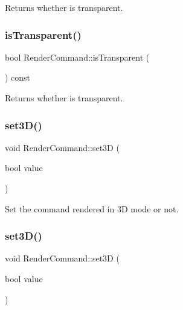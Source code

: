 Returns whether is transparent. \mbox{\label{classRenderCommand_ae1fd8d457e581f0dc5bd7ba1f713f815}} 
\subsubsection{\texorpdfstring{is\+Transparent()}{isTransparent()}\hspace{0.1cm}{\footnotesize\ttfamily [2/2]}}
{\footnotesize\ttfamily bool Render\+Command\+::is\+Transparent (\begin{DoxyParamCaption}{ }\end{DoxyParamCaption}) const\hspace{0.3cm}{\ttfamily [inline]}}

Returns whether is transparent. \mbox{\label{classRenderCommand_a2f19b23dcc4fa705c4af932df41c5606}} 
\subsubsection{\texorpdfstring{set3\+D()}{set3D()}\hspace{0.1cm}{\footnotesize\ttfamily [1/2]}}
{\footnotesize\ttfamily void Render\+Command\+::set3D (\begin{DoxyParamCaption}\item[{bool}]{value }\end{DoxyParamCaption})\hspace{0.3cm}{\ttfamily [inline]}}

Set the command rendered in 3D mode or not. \mbox{\label{classRenderCommand_a2f19b23dcc4fa705c4af932df41c5606}} 
\subsubsection{\texorpdfstring{set3\+D()}{set3D()}\hspace{0.1cm}{\footnotesize\ttfamily [2/2]}}
{\footnotesize\ttfamily void Render\+Command\+::set3D (\begin{DoxyParamCaption}\item[{bool}]{value }\end{DoxyParamCaption})\hspace{0.3cm}{\ttfamily [inline]}}

